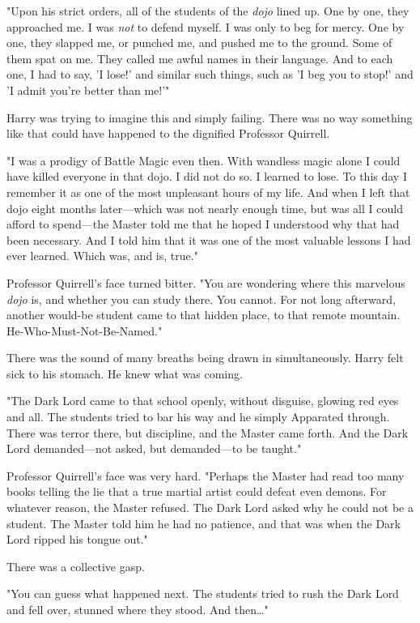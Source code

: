 "Upon his strict orders, all of the students of the \emph{dojo} lined up. One by one, they approached me. I was \emph{not} to defend myself. I was only to beg for mercy. One by one, they slapped me, or punched me, and pushed me to the ground. Some of them spat on me. They called me awful names in their language. And to each one, I had to say, 'I lose!' and similar such things, such as 'I beg you to stop!' and 'I admit you're better than me!'"

Harry was trying to imagine this and simply failing. There was no way something like that could have happened to the dignified Professor Quirrell.

"I was a prodigy of Battle Magic even then. With wandless magic alone I could have killed everyone in that dojo. I did not do so. I learned to lose. To this day I remember it as one of the most unpleasant hours of my life. And when I left that dojo eight months later---which was not nearly enough time, but was all I could afford to spend---the Master told me that he hoped I understood why that had been necessary. And I told him that it was one of the most valuable lessons I had ever learned. Which was, and is, true."

Professor Quirrell's face turned bitter. "You are wondering where this marvelous \emph{dojo} is, and whether you can study there. You cannot. For not long afterward, another would-be student came to that hidden place, to that remote mountain. He-Who-Must-Not-Be-Named."

There was the sound of many breaths being drawn in simultaneously. Harry felt sick to his stomach. He knew what was coming.

"The Dark Lord came to that school openly, without disguise, glowing red eyes and all. The students tried to bar his way and he simply Apparated through. There was terror there, but discipline, and the Master came forth. And the Dark Lord demanded---not asked, but demanded---to be taught."

Professor Quirrell's face was very hard. "Perhaps the Master had read too many books telling the lie that a true martial artist could defeat even demons. For whatever reason, the Master refused. The Dark Lord asked why he could not be a student. The Master told him he had no patience, and that was when the Dark Lord ripped his tongue out."

There was a collective gasp.

"You can guess what happened next. The students tried to rush the Dark Lord and fell over, stunned where they stood. And then{\ldots}"

